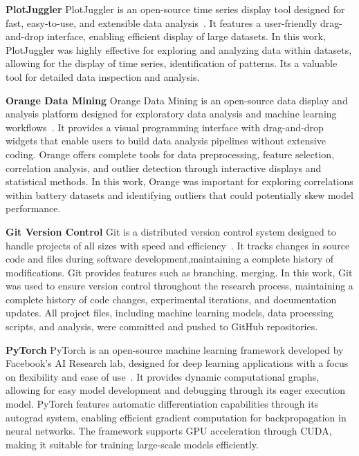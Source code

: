 \textbf{PlotJuggler}
PlotJuggler is an open-source time series display tool designed for fast, easy-to-use, and extensible data analysis~\cite{faconti_facontidavideplotjuggler_2025}. It features a user-friendly drag-and-drop interface, enabling efficient display of large datasets. In this work, PlotJuggler was highly effective for exploring and analyzing data within datasets, allowing for the display of time series, identification of patterns. Its a valuable tool for detailed data inspection and analysis.

\textbf{Orange Data Mining}
Orange Data Mining is an open-source data display and analysis platform designed for exploratory data analysis and machine learning workflows~\cite{noauthor_biolaborange3_nodate}. It provides a visual programming interface with drag-and-drop widgets that enable users to build data analysis pipelines without extensive coding. Orange offers complete tools for data preprocessing, feature selection, correlation analysis, and outlier detection through interactive displays and statistical methods. In this work, Orange was important for exploring correlations within battery datasets and identifying outliers that could potentially skew model performance.

\textbf{Git Version Control}
Git is a distributed version control system designed to handle projects of all sizes with speed and efficiency~\cite{noauthor_git_nodate}. It tracks changes in source code and files during software development,maintaining a complete history of modifications. Git provides features such as branching, merging. In this work, Git was used to ensure version control throughout the research process, maintaining a complete history of code changes, experimental iterations, and documentation updates. All project files, including machine learning models, data processing scripts, and analysis, were committed and pushed to GitHub repositories.

\textbf{PyTorch}
PyTorch is an open-source machine learning framework developed by Facebook's AI Research lab, designed for deep learning applications with a 
focus on flexibility and ease of use~\cite{ansel_pytorch_2024}. It provides dynamic computational graphs, 
allowing for easy model development and debugging through its eager execution model. PyTorch features 
automatic differentiation capabilities through its autograd system, enabling efficient gradient computation 
for backpropagation in neural networks. The framework supports GPU acceleration through CUDA, making it suitable
for training large-scale models efficiently. 

